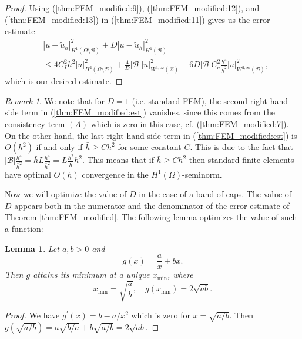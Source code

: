 \documentclass{article}
\newtheorem{lemma}{Lemma}
\theoremstyle{remark}
\newtheorem{remark}{Remark}
\def\B{\mathcal{B}}
\def\WIi{W^{1,\infty}}
\def\WIIi{W^{2,\infty}}
\def\tu{\tilde{u}}
\def\width{\bar{h}}
\begin{document}
\begin{proof}
    Using (\ref{thm:FEM_modified:9}), (\ref{thm:FEM_modified:12}), and (\ref{thm:FEM_modified:13}) in (\ref{thm:FEM_modified:11}) gives us the error estimate 
    \begin{equation*}
    \begin{split}
    \label{thm:FEM_modified:14}
    &|u-\tu_h|^2_{H^1(\Omega\setminus\B)} +D|u-\tu_h|^2_{H^1(\B)}\\ &\leq 4C_I^2h^2|u|^2_{H^2(\Omega\setminus\B)} + \frac{4}{D}|\B| |u|_{\WIi(\B)}^2 +6D|\B|C_c^2 \frac{h^4}{\width^2} |u|^2_{\WIIi(\B)},
    \end{split}
    \end{equation*}
    which is our desired estimate.
    \end{proof}
    
    \begin{remark}
    \label{rem:FEM}
        We note that for $D=1$ (i.e. standard FEM), the second right-hand side term in (\ref{thm:FEM_modified:est}) vanishes, since this comes from the consistency term $(A)$ which is zero in this case, cf. (\ref{thm:FEM_modified:7}). On the other hand, the last right-hand side term in (\ref{thm:FEM_modified:est}) is $O(h^2)$ if and only if $\width\ge Ch^2$ for some constant $C$. This is due to the fact that $|\B|\frac{h^4}{\width^2}=\width L\frac{h^4}{\width^2}=L\frac{h^2}{\width}h^2$. This means that if $\width\ge Ch^2$ then standard finite elements have optimal $O(h)$ convergence in the $H^1(\Omega)$-seminorm.
    \end{remark}
    
    Now we will optimize the value of $D$ in the case of a band of caps. The value of $D$ appears both in the numerator and the denominator of the error estimate of Theorem \ref{thm:FEM_modified}. The following lemma optimizes the value of such a function:
    
    \begin{lemma}
    \label{lem:opt}
    Let $a,b>0$ and
    \begin{equation}
    \label{lem:opt_g}
    g(x)=\frac{a}{x}+bx.
    \end{equation}
    Then $g$ attains its minimum at a unique $x_{\min}$, where
    \begin{equation}
    \label{lem:opt_eq}
    x_{\min}=\sqrt{\frac{a}{b}},\quad g(x_{\min})=2\sqrt{ab}.
    \end{equation}
    \end{lemma}
    \begin{proof}
    We have $g^\prime(x)=b-a/x^2$ which is zero for $x=\sqrt{a/b}$. Then $g(\sqrt{a/b})=a\sqrt{b/a}+b\sqrt{a/b}=2\sqrt{ab}$.
    \end{proof}
    
\end{document}
